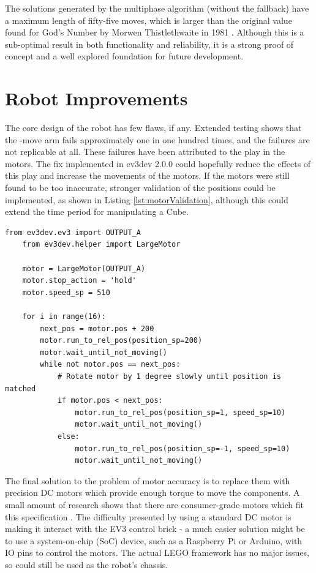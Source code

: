 \documentclass{report}
\newcommand{\move}[1]{\uppercase{\texttt{\formatmovesnospace{#1}}}-move}
\newcommand{\lego}{LEGO }
\begin{document}
	The solutions generated by the multiphase algorithm (without the fallback) have a maximum length of fifty-five moves, which is larger than the original value found for God's Number by Morwen Thistlethwaite in 1981 \cite{Singmaster1981}. Although this is a sub-optimal result in both functionality and reliability, it is a strong proof of concept and a well explored foundation for future development.
	
	\section{Robot Improvements}
	
	The core design of the robot has few flaws, if any. Extended testing shows that the \move{x} arm fails approximately one in one hundred times, and the failures are not replicable at all. These failures have been attributed to the play in the motors. The fix implemented in ev3dev 2.0.0 could hopefully reduce the effects of this play and increase the movements of the motors. If the motors were still found to be too inaccurate, stronger validation of the positions could be implemented, as shown in Listing \ref{lst:motorValidation}, although this could extend the time period for manipulating a Cube. 
	
	\begin{lstlisting}[caption={Potential position validation method for the \lego motors}, label={lst:motorValidation}]
	from ev3dev.ev3 import OUTPUT_A
	from ev3dev.helper import LargeMotor
	
	motor = LargeMotor(OUTPUT_A)
	motor.stop_action = 'hold'
	motor.speed_sp = 510
	
	for i in range(16):
		next_pos = motor.pos + 200
		motor.run_to_rel_pos(position_sp=200)
		motor.wait_until_not_moving()
		while not motor.pos == next_pos:
			# Rotate motor by 1 degree slowly until position is matched
			if motor.pos < next_pos:
				motor.run_to_rel_pos(position_sp=1, speed_sp=10)
				motor.wait_until_not_moving()
			else:
				motor.run_to_rel_pos(position_sp=-1, speed_sp=10)
				motor.wait_until_not_moving()\end{lstlisting}
	
	The final solution to the problem of motor accuracy is to replace them with precision DC motors which provide enough torque to move the components. A small amount of research shows that there are consumer-grade motors which fit this specification \cite{Portescap}. The difficulty presented by using a standard DC motor is making it interact with the EV3 control brick - a much easier solution might be to use a system-on-chip (SoC) device, such as a Raspberry Pi or Arduino, with IO pins to control the motors. The actual \lego framework has no major issues, so could still be used as the robot's chassis.
\end{document}
